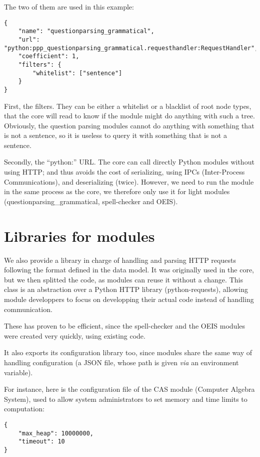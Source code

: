 The two of them are used in this example:

\begin{verbatim}
{
    "name": "questionparsing_grammatical",
    "url": "python:ppp_questionparsing_grammatical.requesthandler:RequestHandler",
    "coefficient": 1,
    "filters": {
        "whitelist": ["sentence"]
    }
}
\end{verbatim}

First, the filters. They can be
either a whitelist or a blacklist of root node types, that the core will
read to know if the module might do anything with such a tree.
Obviously, the question parsing modules cannot do anything with something
that is not a sentence, so it is useless to query it with something that
is not a sentence.

Secondly, the “python:” URL. The core can call directly Python modules
without using HTTP; and thus avoids the cost of serializing, using IPCs
(Inter-Process Communications), and deserializing (twice).
However, we need to run the module in the same process as the core, we therefore
only use it for light modules (questionparsing\_grammatical, spell-checker and OEIS).

\section{Libraries for modules}

We also provide a library in charge of handling and parsing HTTP
requests following the format defined in the data model. It was originally
used in the core, but we then splitted the code, as modules can reuse
it without a change.
This class is an abstraction over a Python HTTP library (python-requests),
allowing module developpers to focus on developping their actual code
instead of handling communication.

These has proven to be efficient, since the spell-checker and the OEIS modules
were created very quickly, using existing code.

It also exports its configuration library too, since modules share the
same way of handling configuration (a JSON file, whose path
is given {\em via} an environment variable).

For instance, here is the configuration file of the CAS module (Computer Algebra
System), used to allow system administrators to set memory and time limits
to computation:

\begin{verbatim}
{
    "max_heap": 10000000,
    "timeout": 10
}
\end{verbatim}
